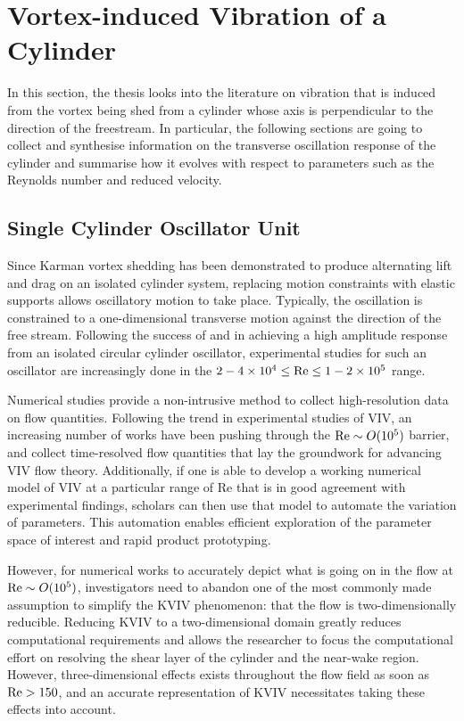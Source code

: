 \documentclass[oneside]{utmthesis}
\begin{document}
\section{Vortex-induced Vibration of a Cylinder} \label{sec:cylinderVIV}
In this section, the thesis looks into the literature on vibration that is induced from the vortex being shed from a cylinder whose axis is perpendicular to the direction of the freestream. In particular, the following sections are going to collect and synthesise information on the transverse oscillation response of the cylinder and summarise how it evolves with respect to parameters such as the Reynolds number and reduced velocity.

\subsection{Single Cylinder Oscillator Unit} \label{ssec:singleCylinderOscillator}
Since Karman vortex shedding has been demonstrated to produce alternating lift and drag on an isolated cylinder system, replacing motion constraints with elastic supports allows oscillatory motion to take place. Typically, the oscillation is constrained to a one-dimensional transverse motion against the direction of the free stream. Following the success of \citet{Raghavan2007} and  \citet{Bernitsas2008a,Bernitsas2008b} in achieving a high amplitude response from an isolated circular cylinder oscillator, experimental studies for such an oscillator are increasingly done in the $2 - 4 \times 10^{4} \leq \text{Re} \leq 1 - 2 \times 10^{5}$ range.

Numerical studies provide a non-intrusive method to collect high-resolution data on flow quantities. Following the trend in experimental studies of VIV, an increasing number of works have been pushing through the $\text{Re} \sim O(10^{5})$ barrier, and collect time-resolved flow quantities that lay the groundwork for advancing VIV flow theory. Additionally, if one is able to develop a working numerical model of VIV at a particular range of Re that is in good agreement with experimental findings, scholars can then use that model to automate the variation of parameters. This automation enables efficient exploration of the parameter space of interest and rapid product prototyping.

However, for numerical works to accurately depict what is going on in the flow at $\text{Re} \sim O(10^{5})$, investigators need to abandon one of the most commonly made assumption to simplify the KVIV phenomenon: that the flow is two-dimensionally reducible. Reducing KVIV to a two-dimensional domain greatly reduces computational requirements and allows the researcher to focus the computational effort on resolving the shear layer of the cylinder and the near-wake region. However, three-dimensional effects exists throughout the flow field as soon as $\text{Re} > 150$, and an accurate representation of KVIV necessitates taking these effects into account.
\end{document}
